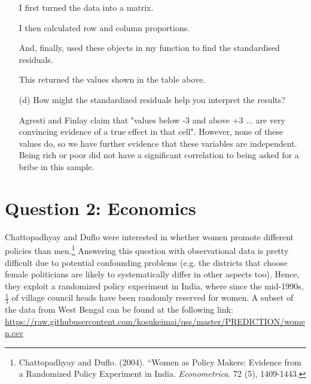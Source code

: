 \documentclass[12pt,letterpaper]{article}
\begin{document}
\begin{enumerate}
	I first turned the data into a matrix.
		  	
	
	I then calculated row and column proportions.
		
	
	And, finally, used these objects in my function to find the standardised residuals.
		
		
	This returned the values shown in the table above. 

	\item [(d)] How might the standardized residuals help you interpret the results?
		  
	Agresti and Finlay claim that "values below -3 and above +3 ... are very convincing evidence of a true effect in that cell". However, none of these values do, so we have further evidence that these variables are independent. Being rich or poor did not have a significant correlation to being asked for a bribe in this sample.
	
\end{enumerate}
\newpage

\section*{Question 2: Economics}
Chattopadhyay and Duflo were interested in whether women promote different policies than men.\footnote{Chattopadhyay and Duflo. (2004). ``Women as Policy Makers: Evidence from a Randomized Policy Experiment in India. \textit{Econometrica}. 72 (5), 1409-1443.} Answering this question with observational data is pretty difficult due to potential confounding problems (e.g. the districts that choose female politicians are likely to systematically differ in other aspects too). Hence, they exploit a randomized policy experiment in India, where since the mid-1990s, $\frac{1}{3}$ of village council heads have been randomly reserved for women. A subset of the data from West Bengal can be found at the following link: \url{https://raw.githubusercontent.com/kosukeimai/qss/master/PREDICTION/women.csv}\\
\end{document}
